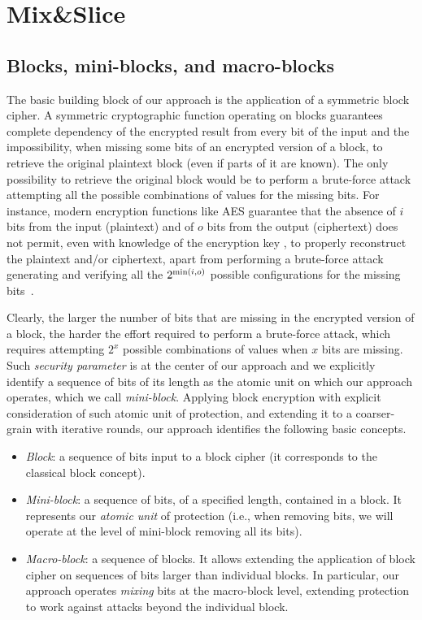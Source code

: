\section{Mix\&Slice}\label{ms:sec:mixslice}

\subsection{Blocks, mini-blocks, and macro-blocks}

The basic building block of our approach is the application of a symmetric block cipher. A symmetric cryptographic function operating on blocks guarantees complete dependency of the encrypted result from every bit of the input and the impossibility, when missing some bits of an encrypted version of a block, to retrieve the original plaintext block (even if parts of it are known). The only possibility to retrieve the original block would be to perform a brute-force attack attempting all the possible combinations of values for the missing bits. For instance, modern encryption functions like AES guarantee that the absence of $i$ bits from the input (plaintext) and of $o$ bits from the output (ciphertext) does not permit, even with knowledge of the encryption key \key{}, to properly reconstruct the plaintext and/or ciphertext, apart from performing a brute-force attack generating and verifying all the $2^{{\rm min}(i,o)}$ possible configurations for the missing bits~\cite{abm14}.

Clearly, the larger the number of bits that are missing in the encrypted version of a block, the harder the effort required to perform a brute-force attack, which requires attempting $2^x$ possible combinations of values when $x$ bits are missing. Such {\em security parameter\/} is at the center of our approach and we explicitly identify a sequence of bits of its length as the atomic unit on which our approach operates, which we call {\em mini-block\/}. Applying block encryption with explicit consideration of such atomic unit of protection, and extending it to a coarser-grain with iterative rounds, our approach identifies the following basic concepts.

\begin{itemize}

\item {\em Block\/}: a sequence of bits input to a
  block cipher (it corresponds to the classical block concept).

\item {\em Mini-block\/}: a sequence of bits, of a specified length,
  contained in a block. It represents our {\em atomic unit\/} of
  protection (i.e., when removing bits, we will operate at the
  level of mini-block removing all its bits).

\item {\em Macro-block\/}: a sequence of blocks. It allows extending
  the application of block cipher on sequences of bits larger than
  individual blocks. In particular, our approach operates {\em
    mixing\/} bits at the macro-block level, extending protection to
  work against attacks beyond the individual block.

\end{itemize}

